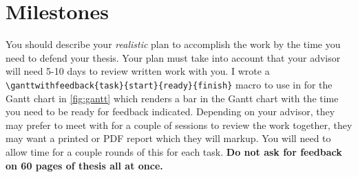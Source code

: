 


\chapter{Milestones}

You should describe your \textit{realistic} plan to accomplish the work by the
time you need to defend your thesis.
Your plan must take into account that your advisor will need 5-10 days to review
written work with you.  I wrote a
\verb|\ganttwithfeedback{task}{start}{ready}{finish}|
macro to use in for the Gantt chart in \autoref{fig:gantt}
which renders a bar in the Gantt chart with the time you need to be ready for
feedback indicated.  Depending on your advisor, they may prefer to meet with for
a couple of sessions to review the work together, they may want a printed or PDF
report which they will markup. You will need to allow time for a couple rounds
of this for each task. \textbf{Do not ask for feedback on 60 pages of thesis all
at once.}



